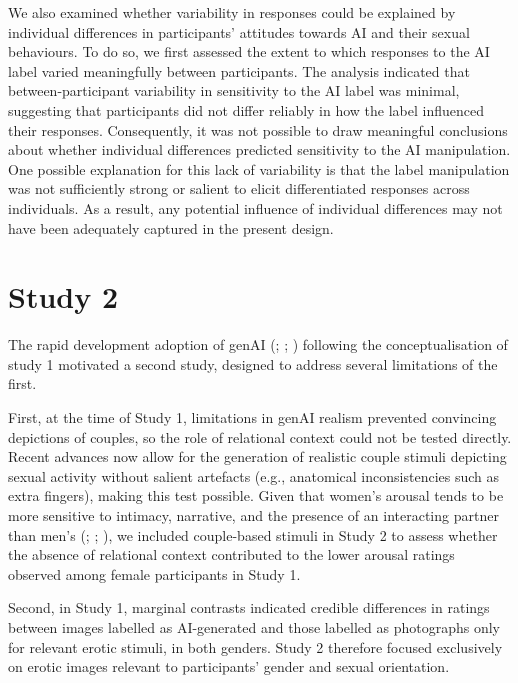 \documentclass[
  jou,
  floatsintext,
  longtable,
  nolmodern,
  notxfonts,
  notimes,
  colorlinks=true,linkcolor=blue,citecolor=blue,urlcolor=blue]{apa7}
\begin{document}
We also examined whether variability in responses could be explained by
individual differences in participants' attitudes towards AI and their
sexual behaviours. To do so, we first assessed the extent to which
responses to the AI label varied meaningfully between participants. The
analysis indicated that between-participant variability in sensitivity
to the AI label was minimal, suggesting that participants did not differ
reliably in how the label influenced their responses. Consequently, it
was not possible to draw meaningful conclusions about whether individual
differences predicted sensitivity to the AI manipulation. One possible
explanation for this lack of variability is that the label manipulation
was not sufficiently strong or salient to elicit differentiated
responses across individuals. As a result, any potential influence of
individual differences may not have been adequately captured in the
present design.

\section{Study 2}\label{study-2}

The rapid development adoption of genAI
(;
;
) following the
conceptualisation of study 1 motivated a second study, designed to
address several limitations of the first.

First, at the time of Study 1, limitations in genAI realism prevented
convincing depictions of couples, so the role of relational context
could not be tested directly. Recent advances now allow for the
generation of realistic couple stimuli depicting sexual activity without
salient artefacts (e.g., anatomical inconsistencies such as extra
fingers), making this test possible. Given that women's arousal tends to
be more sensitive to intimacy, narrative, and the presence of an
interacting partner than men's
(;
;
), we included
couple-based stimuli in Study 2 to assess whether the absence of
relational context contributed to the lower arousal ratings observed
among female participants in Study 1.

Second, in Study 1, marginal contrasts indicated credible differences in
ratings between images labelled as AI-generated and those labelled as
photographs only for relevant erotic stimuli, in both genders. Study 2
therefore focused exclusively on erotic images relevant to participants'
gender and sexual orientation.
\end{document}
